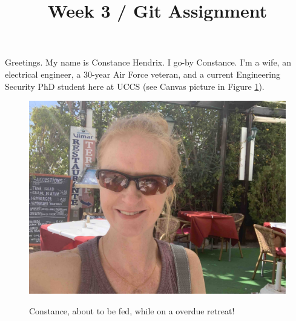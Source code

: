 \documentclass[12pt,conference]{IEEEtran}
\begin{document}
\title{Week 3 / Git Assignment} 

\author{
}


\maketitle

Greetings.  My name is Constance Hendrix.  I go-by Constance.  I’m a wife, an electrical engineer, a 30-year Air Force veteran, and a current Engineering Security PhD student here at UCCS (see Canvas picture in Figure \ref{fig:me}). 
\begin{figure}
    \caption{Constance, about to be fed, while on a overdue retreat!}
    \centering
    \includegraphics[scale=0.06]{canvas.jpg}
    \label{fig:me}
\end{figure}
\end{document}
